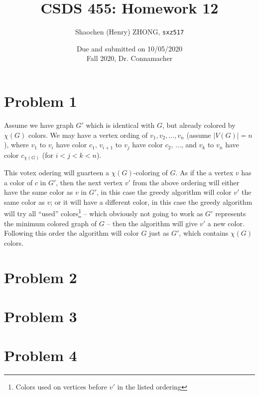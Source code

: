 \documentclass[11pt]{article}
\newcommand{\ilc}{\texttt}
\begin{document}
\title{\textbf{CSDS 455: Homework 12}}

\author{Shaochen (Henry) ZHONG, \ilc{sxz517}}
\date{Due and submitted on 10/05/2020 \\ Fall 2020, Dr. Connamacher}
\maketitle


\section*{Problem 1}

Assume we have graph $G'$ which is identical with $G$, but already colored by $\chi(G)$ colors. We may have a vertex ording of $v_1, v_2, ..., v_n$ (assume $|V(G)| = n$), where $v_1$ to $v_i$ have color $c_1$, $v_{i+1}$ to $v_{j}$ have color $c_2$, ..., and $v_k$ to $v_n$ have color $c_{\chi(G)}$ (for $i < j < k < n$).

This votex odering will guarteen a $\chi(G)$-coloring of $G$. As if the a vertex $v$ has a color of $c$ in $G'$, then the next vertex $v'$ from the above ordering will either have the same color as $v$ in $G'$, in this case the greedy algorithm will color $v'$ the same color as $v$; or it will have a different color, in this case the greedy algorithm will try all ``used'' colors\footnote{Colors used on vertices before $v'$ in the listed ordering} -- which obviously not going to work as $G'$ represents the minimum colored graph of $G$ -- then the algorithm will give $v'$ a new color. Following this order the algorithm will color $G$ just as $G'$, which contains $\chi(G)$ colors.


\section*{Problem 2}
\section*{Problem 3}
\section*{Problem 4}
%
% 
% 
\end{document}
